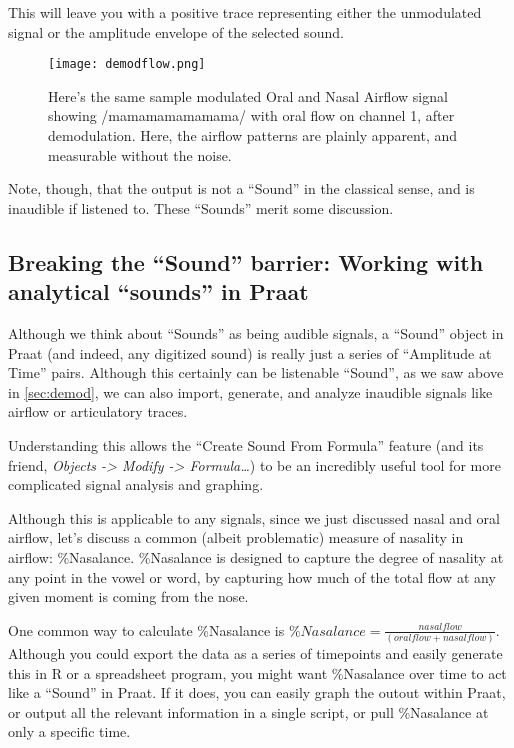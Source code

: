 This will leave you with a positive trace representing either the
unmodulated signal or the amplitude envelope of the selected sound.

\begin{figure}
  \centerline{
    \mbox{\texttt{[image: demodflow.png]}}
  }
  \caption{Here's the same sample modulated Oral and Nasal Airflow signal showing /mamamamamamama/ with oral flow on channel 1, after demodulation. Here, the airflow patterns are plainly apparent, and measurable without the noise.}
  \label{fig:flow}
  \end{figure}

Note, though, that the output is not a ``Sound'' in the classical sense,
and is inaudible if listened to. These ``Sounds'' merit some discussion.

\hypertarget{breaking-the-sound-barrier-working-with-analytical-sounds-in-praat}{%
\subsection{Breaking the ``Sound'' barrier: Working with analytical
``sounds'' in
Praat}\label{breaking-the-sound-barrier-working-with-analytical-sounds-in-praat}}

\label{sec:soundbarrier}

Although we think about ``Sounds'' as being audible signals, a ``Sound''
object in Praat (and indeed, any digitized sound) is really just a
series of ``Amplitude at Time'' pairs. Although this certainly can be
listenable ``Sound'', as we saw above in \ref{sec:demod}, we can also
import, generate, and analyze inaudible signals like airflow or
articulatory traces.

Understanding this allows the ``Create Sound From Formula'' feature (and
its friend, \emph{Objects -\textgreater{} Modify -\textgreater{}
Formula\ldots{}}) to be an incredibly useful tool for more complicated
signal analysis and graphing.

Although this is applicable to any signals, since we just discussed
nasal and oral airflow, let's discuss a common (albeit problematic)
measure of nasality in airflow: \%Nasalance. \%Nasalance is designed to
capture the degree of nasality at any point in the vowel or word, by
capturing how much of the total flow at any given moment is coming from
the nose.

One common way to calculate \%Nasalance is
\(\%Nasalance=\frac{nasal flow}{(oral flow + nasal flow)}\). Although
you could export the data as a series of timepoints and easily generate
this in R or a spreadsheet program, you might want \%Nasalance over time
to act like a ``Sound'' in Praat. If it does, you can easily graph the
outout within Praat, or output all the relevant information in a single
script, or pull \%Nasalance at only a specific time.

